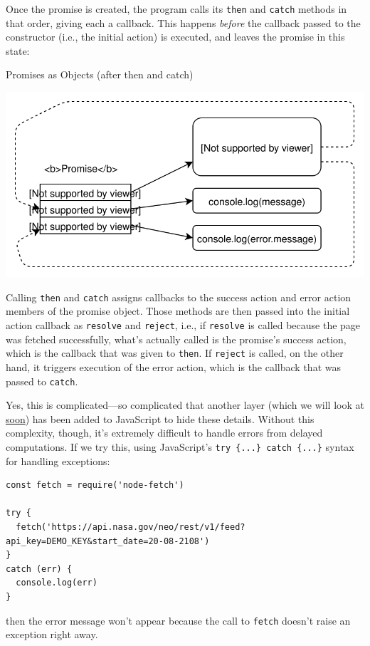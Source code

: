 Once the promise is created, the program calls its \texttt{then} and
\texttt{catch} methods in that order, giving each a callback. This
happens \emph{before} the callback passed to the constructor (i.e., the
initial action) is executed, and leaves the promise in this state:

Promises as Objects (after then and catch)

\includegraphics{../../files/promises-object-b.svg}

Calling \texttt{then} and \texttt{catch} assigns callbacks to the
success action and error action members of the promise object. Those
methods are then passed into the initial action callback as
\texttt{resolve} and \texttt{reject}, i.e., if \texttt{resolve} is
called because the page was fetched successfully, what's actually called
is the promise's success action, which is the callback that was given to
\texttt{then}. If \texttt{reject} is called, on the other hand, it
triggers execution of the error action, which is the callback that was
passed to \texttt{catch}.

Yes, this is complicated---so complicated that another layer (which we
will look at \protect\hyperlink{s:promises-async-await}{soon}) has been
added to JavaScript to hide these details. Without this complexity,
though, it's extremely difficult to handle errors from delayed
computations. If we try this, using JavaScript's
\texttt{try\ \{...\}\ catch\ \{...\}} syntax for handling exceptions:

\begin{verbatim}
const fetch = require('node-fetch')

try {
  fetch('https://api.nasa.gov/neo/rest/v1/feed?api_key=DEMO_KEY&start_date=20-08-2108')
}
catch (err) {
  console.log(err)
}
\end{verbatim}

then the error message won't appear because the call to \texttt{fetch}
doesn't raise an exception right away.

